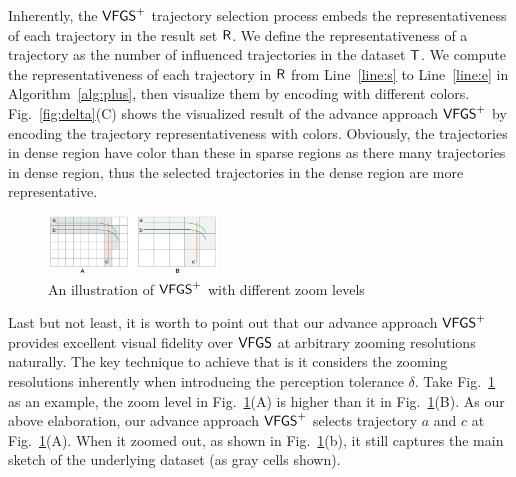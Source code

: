 Inherently, the $\mathsf{VFGS}^{+}$ trajectory selection process embeds the representativeness of each trajectory in the result set $\mathsf{R}$.
We define the representativeness of a trajectory as the number of influenced trajectories in the dataset $\mathsf{T}$.
We compute the representativeness of each trajectory in $\mathsf{R}$ from Line~\ref{line:s} to Line~\ref{line:e} in Algorithm~\ref{alg:plus}, then visualize them by encoding with different colors.
Fig.~\ref{fig:delta}(C) shows the visualized result of the  advance approach $\mathsf{VFGS}^{+}$ by encoding the trajectory representativeness with colors.
Obviously, the trajectories in dense region have  color than these in sparse regions as there many trajectories in dense region, thus the selected trajectories in the dense region are more representative.

\begin{figure}[t]
	\centering
	\includegraphics[width=0.4\textwidth]{pictures/problemsolveing/one_to_many.pdf}
	\vspace{-3mm}
	\caption{An illustration of $\mathsf{VFGS}^{+}$ with different zoom levels}
	\label{fig:zoom}
    \vspace{-6mm}
\end{figure}

Last but not least, it is worth to point out that our advance approach $\mathsf{VFGS}^{+}$ provides excellent visual fidelity over $\mathsf{VFGS}$ at arbitrary zooming resolutions naturally.
The key technique to achieve that is it considers the zooming resolutions inherently when introducing the perception tolerance $\delta$.
Take Fig.~\ref{fig:zoom} as an example, %
the zoom level in Fig.~\ref{fig:zoom}(A) is higher than it in Fig.~\ref{fig:zoom}(B).
As our above elaboration, our advance approach $\mathsf{VFGS}^{+}$ selects trajectory $a$ and $c$ at Fig.~\ref{fig:zoom}(A).
When it zoomed out, as shown in Fig.~\ref{fig:zoom}(b), it still captures the main sketch of the underlying dataset (as gray cells shown).







